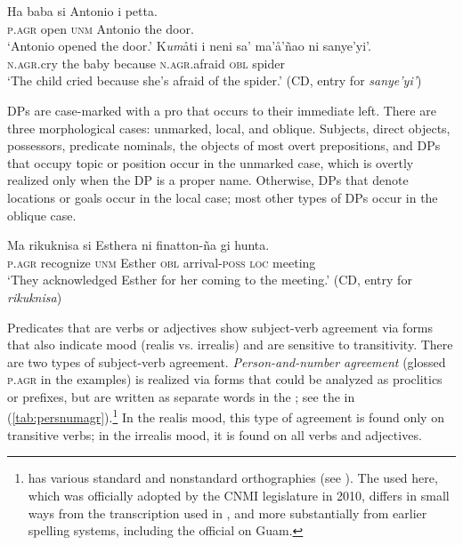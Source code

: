 \documentclass[output=paper,
modfonts
]{LSP/langsci}
\begin{document}
\begin{exe}
\ex \label{ex:chung:1}
\begin{xlist}
\ex \label{ex:chung:1a} 
\gll Ha baba si Antonio i petta.\\
\textsc{p.agr} open \textsc{unm} Antonio the door.\\
\glt `Antonio opened the door.'
\ex \label{ex:chung:1b} \gll K\emph{um}åti i neni sa' ma'å'ñao ni sanye'yi'.\\
\textsc{n.agr.}cry the baby because \textsc{n.agr.}afraid \textsc{obl} spider\\
\glt `The child cried because she's afraid of the spider.' (CD, entry for
\emph{sanye'yi'}) 
\z
\z

DPs are case-marked with a pro that occurs to
their immediate left. There are three morphological cases: unmarked,
local, and oblique. Subjects, direct objects, possessors, predicate
nominals, the objects of most overt prepositions, and DPs that occupy
topic or  position occur in the unmarked case, which is overtly
realized only when the DP is a proper name. Otherwise, DPs that denote
locations or goals occur in the local case; most other types of DPs
occur in the oblique case.

\ea \label{ex:chung:2}
\gll Ma rikuknisa si Esthera ni finatton-ña gi hunta.\\
\textsc{p.agr} recognize \textsc{unm} Esther \textsc{obl} arrival-\textsc{poss} \textsc{loc} meeting\\
\glt `They acknowledged Esther for her coming to the meeting.' (CD, entry for \emph{rikuknisa})
\z

Predicates that are verbs or adjectives show subject-verb agreement via
forms that also indicate mood (realis vs. irrealis) and are sensitive to
transitivity. There are two types of subject-verb agreement.
\emph{Person-and-number agreement} (glossed \textsc{p.agr} in the
examples\textsc{)} is realized via forms that could be analyzed as
proclitics or prefixes, but are written as separate words in the
 ; see the  in (\ref{tab:persnumagr}).\footnote{ has
  various standard and nonstandard orthographies (see \citealt[Appendix A]{chung1998}). The  used here, which was officially adopted
  by the CNMI legislature in 2010, differs in small ways from the
  transcription used in \citealt{chung1998}, and more substantially from earlier
  spelling systems, including the official  on Guam.} In the
realis mood, this type of agreement is found only on transitive verbs;
in the irrealis mood, it is found on all verbs and adjectives.


\end{xlist}
\end{exe}
\end{document}
